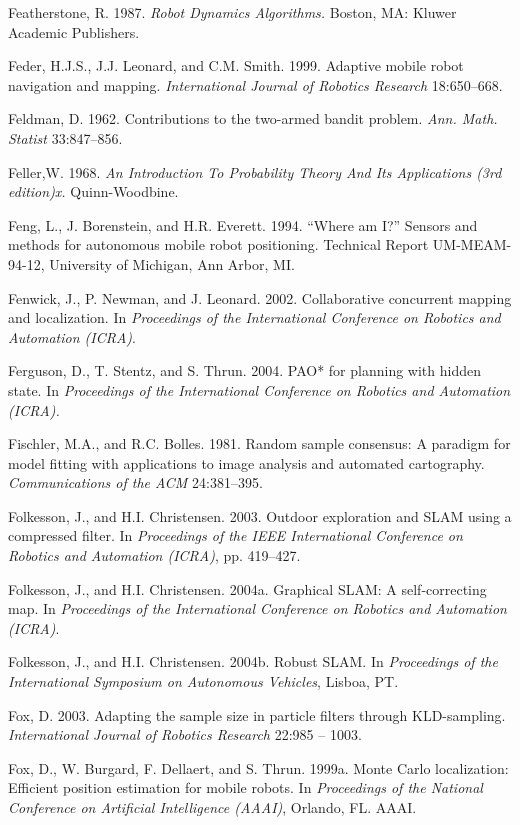 \documentclass[10pt,a4paper]{article}
\begin{document}
Featherstone, R. 1987.\textit{ Robot Dynamics Algorithms.} Boston, MA: Kluwer Academic
Publishers.

Feder, H.J.S., J.J. Leonard, and C.M. Smith. 1999. Adaptive mobile robot navigation
and mapping. \textit{International Journal of Robotics Research} 18:650–668.

Feldman, D. 1962. Contributions to the two-armed bandit problem. \textit{Ann. Math. Statist}
33:847–856.

Feller,W. 1968. \textit{An Introduction To Probability Theory And Its Applications (3rd edition)x.}
Quinn-Woodbine.

Feng, L., J. Borenstein, and H.R. Everett. 1994. “Where am I?” Sensors and methods
for autonomous mobile robot positioning. Technical Report UM-MEAM-94-12,
University of Michigan, Ann Arbor, MI.

Fenwick, J., P. Newman, and J. Leonard. 2002. Collaborative concurrent mapping and
localization. In \textit{Proceedings of the International Conference on Robotics and Automation
(ICRA)}.

Ferguson, D., T. Stentz, and S. Thrun. 2004. PAO* for planning with hidden state. In
\textit{Proceedings of the International Conference on Robotics and Automation (ICRA).}

Fischler, M.A., and R.C. Bolles. 1981. Random sample consensus: A paradigm
for model fitting with applications to image analysis and automated cartography.
\textit{Communications of the ACM} 24:381–395.

Folkesson, J., and H.I. Christensen. 2003. Outdoor exploration and SLAM using a
compressed filter. In \textit{Proceedings of the IEEE International Conference on Robotics and
Automation (ICRA)}, pp. 419–427.

Folkesson, J., and H.I. Christensen. 2004a. Graphical SLAM: A self-correcting map.
In \textit{Proceedings of the International Conference on Robotics and Automation (ICRA)}.

Folkesson, J., and H.I. Christensen. 2004b. Robust SLAM. In \textit{Proceedings of the International
Symposium on Autonomous Vehicles}, Lisboa, PT.

Fox, D. 2003. Adapting the sample size in particle filters through KLD-sampling.
\textit{International Journal of Robotics Research} 22:985 – 1003.

Fox, D., W. Burgard, F. Dellaert, and S. Thrun. 1999a. Monte Carlo localization: Efficient
position estimation for mobile robots. In \textit{Proceedings of the National Conference
on Artificial Intelligence (AAAI)}, Orlando, FL. AAAI.
\end{document}

